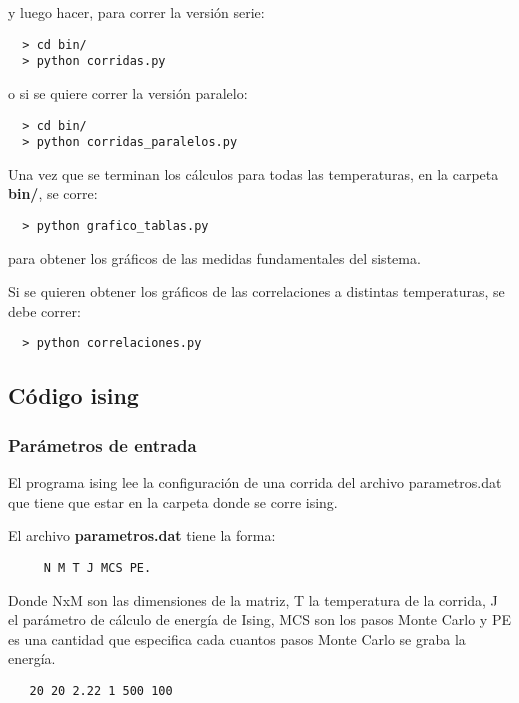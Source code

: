 y luego hacer, para correr la versión serie:

\begin{verbatim}
  > cd bin/
  > python corridas.py
\end{verbatim}

o si se quiere correr la versión paralelo:

\begin{verbatim}
  > cd bin/
  > python corridas_paralelos.py
\end{verbatim}


Una vez que se terminan los cálculos para todas las temperaturas,  en 
la carpeta \textbf{bin/}, se corre:

\begin{verbatim}
  > python grafico_tablas.py 
\end{verbatim}

para obtener los gráficos de las medidas fundamentales del sistema.

Si se quieren obtener los gráficos de las correlaciones a distintas temperaturas, 
se debe correr:

\begin{verbatim}
  > python correlaciones.py 
\end{verbatim}



\subsection{C\'odigo ising}

\subsubsection{Par\'ametros de entrada}

El programa ising lee la configuraci\'on de una corrida del 
archivo parametros.dat que tiene que estar en la carpeta donde se
corre ising.

El archivo \textbf{parametros.dat} tiene la forma: 

\begin{verbatim}
     N M T J MCS PE. 
\end{verbatim}

Donde NxM 
son las dimensiones de la matriz, T la temperatura de la corrida,
J el par\'ametro de c\'alculo de energ\'ia de Ising, MCS son los pasos Monte Carlo y PE
es una cantidad que especifica cada cuantos pasos Monte Carlo se graba la energ\'ia.

\begin{verbatim}
   20 20 2.22 1 500 100
\end{verbatim}


